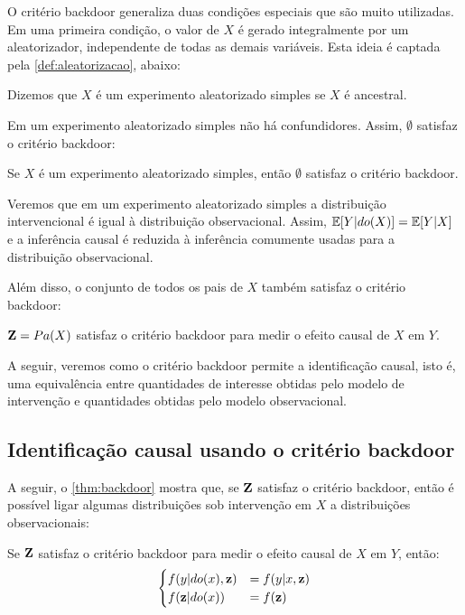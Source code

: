O critério backdoor generaliza duas condições especiais que
são muito utilizadas.
Em uma primeira condição, 
o valor de $X$ é gerado integralmente por
um aleatorizador, independente de todas as demais variáveis.
Esta ideia é captada pela 
\cref{def:aleatorizacao}, abaixo:

\begin{definition}
 \label{def:aleatorizacao}
 Dizemos que $X$ é um experimento aleatorizado simples 
 se $X$ é ancestral.
\end{definition}

Em um experimento aleatorizado simples não há confundidores.
Assim, $\emptyset$ satisfaz o critério backdoor:

\begin{lemma}
 \label{lemma:backdoor_random}
 Se $X$ é um experimento aleatorizado simples, então
 $\emptyset$ satisfaz o critério backdoor.
\end{lemma}

Veremos que em um experimento aleatorizado simples a
distribuição intervencional é igual 
à distribuição observacional.
Assim, ${\mathbb E}[Y|do(X)] = {\mathbb E}[Y|X]$ e
a inferência causal é reduzida 
à inferência comumente usadas para
a distribuição observacional.

Além disso, o conjunto de todos os pais de $X$
também satisfaz o critério backdoor:

\begin{lemma}
 \label{lemma:backdoor_pais}
 ${\mathbf{Z}} = Pa(X)$ satisfaz o critério backdoor para
 medir o efeito causal de $X$ em $Y$.
\end{lemma}

A seguir, veremos como o critério backdoor permite
a identificação causal, isto é,
uma equivalência entre quantidades de interesse
obtidas pelo modelo de intervenção e
quantidades obtidas pelo modelo observacional.

\subsection{Identificação causal usando o critério backdoor}

A seguir, o \cref{thm:backdoor} mostra que,
se ${\mathbf{Z}}$ satisfaz o critério backdoor, então
é possível ligar algumas 
distribuições sob intervenção em $X$ a
distribuições observacionais:

\begin{theorem}
 \label{thm:backdoor}
 Se ${\mathbf{Z}}$ satisfaz 
 o critério backdoor para medir
 o efeito causal de $X$ em $Y$, então:
 \begin{align*}
  \begin{cases}
   f(y|do(x),{\mathbf{z}}) &= f(y|x,{\mathbf{z}}) \\
   f({\mathbf{z}}|do(x)) &= f({\mathbf{z}})
  \end{cases}
 \end{align*}
\end{theorem}

